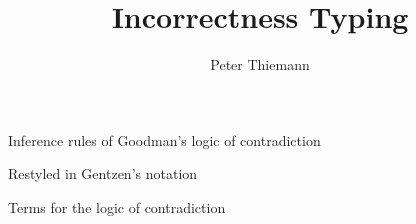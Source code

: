 \documentclass[11pt]{article}
\title{Incorrectness Typing}
\author{Peter Thiemann}
\newcommand\FormA{\varphi}
\newcommand\FormB{\psi}
\newcommand\FormC{\chi}
\newcommand\SuccC{\Gamma}
\newcommand\SuccD{\Delta}
\newcommand\Conj{\wedge}
\newcommand\Truth{\top}
\newcommand\Entails{\Longrightarrow}
\newcommand\SwitchGentzen{
  \renewcommand\FormA{A}
  \renewcommand\FormB{B}
  \renewcommand\FormC{C}
  \renewcommand\SuccC{\Lambda}
  \renewcommand\SuccD{\Theta}

  \renewcommand\Conj{\And}
  \renewcommand\Truth{\top}

  \renewcommand\Entails{\vdash}
}
\begin{document}
\maketitle

Inference rules of Goodman's logic of contradiction


\clearpage
\SwitchGentzen
Restyled in Gentzen's notation


\clearpage
Terms for the logic of contradiction

\end{document}
